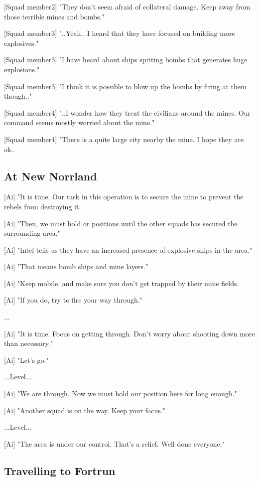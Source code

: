 \documentclass[a4paper,12pt]{article}
\begin{document}
[Squad member2] "They don't seem afraid of collateral damage. Keep away from those terrible mines and bombs."

[Squad member3] "..Yeah.. I heard that they have focused on building more explosives."

[Squad member3] "I have heard about ships spitting bombs that generates huge explosions." 

[Squad member3] "I think it is possible to blow up the bombs by firing at them though.."

[Squad member4] "..I wonder how they treat the civilians around the mines. Our command seems mostly worried
about the mine." 

[Squad member4] "There is a quite large city nearby the mine. I hope they are ok..

\subsection{At New Norrland}

[Ai] "It is time. Our task in this operation is to secure the mine to prevent the rebels from destroying it. 

[Ai] "Then, we must hold or positions until the other squads has secured the surrounding area."

[Ai] "Intel tells us they have an increased presence of explosive ships in the area." 

[Ai] "That means bomb ships and mine layers." 

[Ai] "Keep mobile, and make sure you don't get trapped by their mine fields. 

[Ai] "If you do, try to fire your way through."

...

[Ai] "It is time. Focus on getting through. Don't worry about shooting
down more than necessary." 

[Ai] "Let's go."

...Level...

[Ai] "We are through. Now we must hold our position here for long enough."

[Ai] "Another squad is on the way. Keep your focus."

...Level...

[Ai] "The area is under our control. That's a relief. Well done everyone."

\subsection{Travelling to Fortrun}
\end{document}
